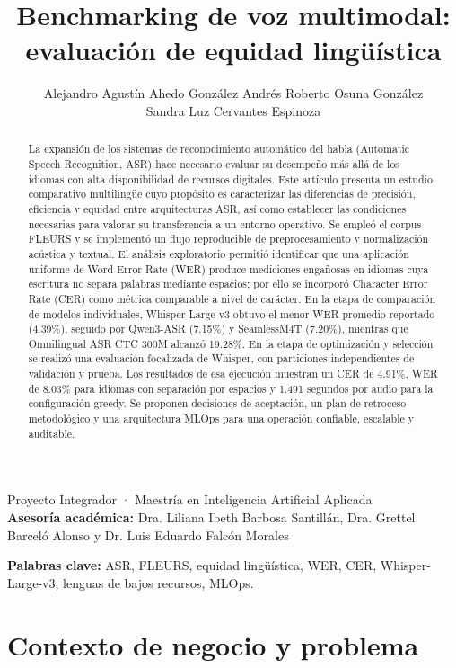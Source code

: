 \documentclass[11pt,letterpaper]{article}
\title{\textbf{Benchmarking de voz multimodal: evaluación de equidad lingüística}}
\author{Alejandro Agustín Ahedo González \quad Andrés Roberto Osuna González\\[2pt] Sandra Luz Cervantes Espinoza\\[6pt]}
\begin{document}
\maketitle
\begin{center}\small
      \normalsize Proyecto Integrador · Maestría en Inteligencia Artificial Aplicada \\[6pt]
\textbf{Asesoría académica:} Dra. Liliana Ibeth Barbosa Santillán, Dra. Grettel Barceló Alonso y Dr. Luis Eduardo Falcón Morales\\
\end{center}

\begin{abstract}
La expansión de los sistemas de reconocimiento automático del habla (Automatic Speech Recognition, ASR) hace necesario evaluar su desempeño más allá de los idiomas con alta disponibilidad de recursos digitales. Este artículo presenta un estudio comparativo multilingüe cuyo propósito es caracterizar las diferencias de precisión, eficiencia y equidad entre arquitecturas ASR, así como establecer las condiciones necesarias para valorar su transferencia a un entorno operativo. Se empleó el corpus FLEURS y se implementó un flujo reproducible de preprocesamiento y normalización acústica y textual. El análisis exploratorio permitió identificar que una aplicación uniforme de Word Error Rate (WER) produce mediciones engañosas en idiomas cuya escritura no separa palabras mediante espacios; por ello se incorporó Character Error Rate (CER) como métrica comparable a nivel de carácter. En la etapa de comparación de modelos individuales, Whisper-Large-v3 obtuvo el menor WER promedio reportado (4.39\%), seguido por Qwen3-ASR (7.15\%) y SeamlessM4T (7.20\%), mientras que Omnilingual ASR CTC 300M alcanzó 19.28\%. En la etapa de optimización y selección se realizó una evaluación focalizada de Whisper, con particiones independientes de validación y prueba. Los resultados de esa ejecución muestran un CER de 4.91\%, WER de 8.03\% para idiomas con separación por espacios y 1.491 segundos por audio para la configuración greedy. Se proponen decisiones de aceptación, un plan de retroceso metodológico y una arquitectura MLOps para una operación confiable, escalable y auditable.
\end{abstract}
\noindent\textbf{Palabras clave:} ASR, FLEURS, equidad lingüística, WER, CER, Whisper-Large-v3, lenguas de bajos recursos, MLOps.

\section{Contexto de negocio y problema}
\end{document}

